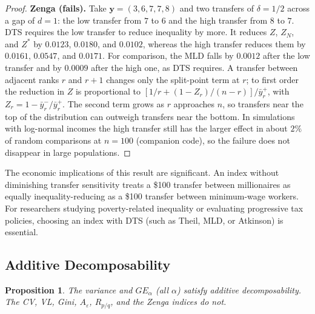 \documentclass[12pt]{article}
\theoremstyle{plain}
\newtheorem{proposition}[theorem]{Proposition}
\theoremstyle{definition}
\theoremstyle{remark}
\newcommand{\bfy}{\mathbf{y}}
\begin{document}
\begin{proof}
\textbf{Zenga (fails).}
Take $\bfy = (3, 6, 7, 7, 8)$ and two transfers of $\delta = 1/2$ across a gap of $d = 1$: the low transfer from $7$ to $6$ and the high transfer from $8$ to $7$.
DTS requires the low transfer to reduce inequality by more.
It reduces $Z$, $Z_N$, and $Z^*$ by $0.0123$, $0.0180$, and $0.0102$, whereas the high transfer reduces them by $0.0161$, $0.0547$, and $0.0171$.
For comparison, the MLD falls by $0.0012$ after the low transfer and by $0.0009$ after the high one, as DTS requires.
A transfer between adjacent ranks $r$ and $r+1$ changes only the split-point term at $r$; to first order the reduction in $Z$ is proportional to $[1/r + (1 - Z_r)/(n - r)]/\bar{y}^{+}_r$, with $Z_r = 1 - \bar{y}^{-}_r/\bar{y}^{+}_r$.
The second term grows as $r$ approaches $n$, so transfers near the top of the distribution can outweigh transfers near the bottom.
In simulations with log-normal incomes the high transfer still has the larger effect in about $2\%$ of random comparisons at $n = 100$ (companion code), so the failure does not disappear in large populations.
\end{proof}

The economic implications of this result are significant.
An index without diminishing transfer sensitivity treats a \$100 transfer between millionaires as equally inequality-reducing as a \$100 transfer between minimum-wage workers.
For researchers studying poverty-related inequality or evaluating progressive tax policies, choosing an index with DTS (such as Theil, MLD, or Atkinson) is essential.

\subsection{Additive Decomposability}

\begin{proposition}\label{prop:decomp}
The variance and $GE_\alpha$ (all $\alpha$) satisfy additive decomposability.
The CV, VL, Gini, $A_\varepsilon$, $R_{p/q}$, and the Zenga indices do not.
\end{proposition}
\end{document}
